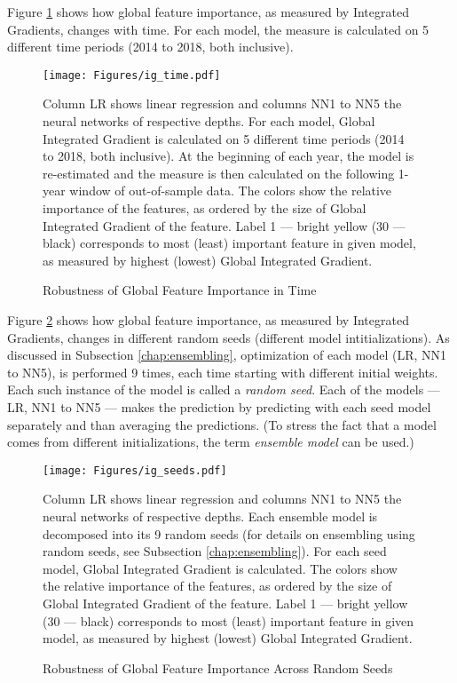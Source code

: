 		Figure \ref{fig:ig_time} shows how global feature importance, as measured by Integrated Gradients, changes with time. For each model, the measure is calculated on 5 different time periods (2014 to 2018, both inclusive).
		
		\begin{center}
			\begin{figure}
				\texttt{[image: Figures/ig\_time.pdf]}
				\caption{Robustness of Global Feature Importance in Time}
				\medskip
				\small
				Column LR shows linear regression and columns NN1 to NN5 the neural networks of respective depths. For each model, Global Integrated Gradient is calculated on 5 different time periods (2014 to 2018, both inclusive). At the beginning of each year, the model is re-estimated and the measure is then calculated on the following 1-year window of out-of-sample data. The colors show the relative importance of the features, as ordered by the size of Global Integrated Gradient of the feature. Label 1 --- bright yellow (30 --- black) corresponds to most (least) important feature in given model, as measured by highest (lowest) Global Integrated Gradient.   
				\label{fig:ig_time}
			\end{figure}
		\end{center}
	
	
		Figure \ref{fig:ig_seeds} shows how global feature importance, as measured by Integrated Gradients, changes in different random seeds (different model intitializations). As discussed in Subsection \ref{chap:ensembling}, optimization of each model (LR, NN1 to NN5), is performed 9 times, each time starting with different initial weights. Each such instance of the model is called a \textit{random seed}. Each of the models --- LR, NN1 to NN5 --- makes the prediction by predicting with each seed model separately and than averaging the predictions. (To stress the fact that a model comes from different initializations, the term \textit{ensemble model} can be used.)
		
		\begin{center}
			\begin{figure}
				\texttt{[image: Figures/ig\_seeds.pdf]}
				\caption{Robustness of Global Feature Importance Across Random Seeds}
				\medskip
				\small
				Column LR shows linear regression and columns NN1 to NN5 the neural networks of respective depths. Each ensemble model is decomposed into its 9 random seeds (for details on ensembling using random seeds, see Subsection \ref{chap:ensembling}). For each seed model, Global Integrated Gradient is calculated. The colors show the relative importance of the features, as ordered by the size of Global Integrated Gradient of the feature. Label 1 --- bright yellow (30 --- black) corresponds to most (least) important feature in given model, as measured by highest (lowest) Global Integrated Gradient.    
				\label{fig:ig_seeds}
			\end{figure}
		\end{center}